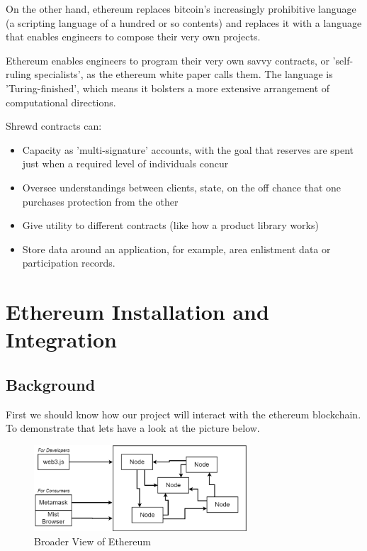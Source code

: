 On the other hand, ethereum replaces bitcoin's increasingly prohibitive language (a scripting language of a hundred or so contents) and replaces it with a language that enables engineers to compose their very own projects. 

Ethereum enables engineers to program their very own savvy contracts, or 'self-ruling specialists', as the ethereum white paper calls them. The language is 'Turing-finished', which means it bolsters a more extensive arrangement of computational directions.

Shrewd contracts can: 
\begin{itemize}
	\item Capacity as 'multi-signature' accounts, with the goal that reserves are spent just when a required level of individuals concur 
	\item Oversee understandings between clients, state, on the off chance that one purchases protection from the other
	\item Give utility to different contracts (like how a product library works) 
	
	\item Store data around an application, for example, area enlistment data or participation records.
\end{itemize}

\newpage
\section{Ethereum Installation and Integration}
\subsection{Background}
First we should know how our project will interact with the ethereum blockchain. To demonstrate that lets have a look at the picture below.
\begin{figure}[h]
	\centering
	\includegraphics[width=300px]{figures/Ethereum/04.png}
	\caption{Broader View of Ethereum}
	\label{fig:eth4}
\end{figure}


